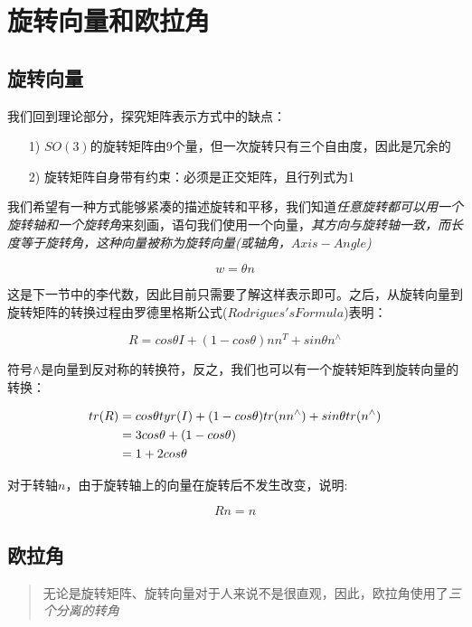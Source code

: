\section{旋转向量和欧拉角}

\subsection{旋转向量}

    我们回到理论部分，探究矩阵表示方式中的缺点：

\begin{itemize}
    \item [1)] $SO(3)$的旋转矩阵由9个量，但一次旋转只有三个自由度，因此是冗余的
    \item [2)] 旋转矩阵自身带有约束：必须是正交矩阵，且行列式为1
\end{itemize}

    我们希望有一种方式能够紧凑的描述旋转和平移，我们知道\emph{任意旋转都可以用一个旋转轴和一个旋转角}来刻画，语句我们使用一个向量，\emph{其方向与旋转轴一致，而长度等于旋转角，这种向量被称为旋转向量(或轴角，$Axis-Angle$)}

$$
    w = \theta{n}
$$

    这是下一节中的李代数，因此目前只需要了解这样表示即可。之后，从旋转向量到旋转矩阵的转换过程由罗德里格斯公式($Rodrigues's Formula$)表明：

$$
    R = cos\theta{I} + (1 - cos\theta)nn^T + sin\theta{n^\land}
$$

    符号$\land$是向量到反对称的转换符，反之，我们也可以有一个旋转矩阵到旋转向量的转换：

$$
\begin{aligned}
    tr(R) &= cos\theta{tyr(I)} + (1 - cos\theta)tr(nn^\land) + sin\theta{tr(n^\land)} \\
        &= 3cos\theta + (1 - cos\theta) \\
        &= 1 + 2cos\theta
\end{aligned} \\
$$

    对于转轴$n$，由于旋转轴上的向量在旋转后不发生改变，说明:

$$
    Rn = n
$$

\subsection{欧拉角}

\begin{quote}
    \centering
    无论是旋转矩阵、旋转向量对于人来说不是很直观，因此，欧拉角使用了\emph{三个分离的转角}
\end{quote}

